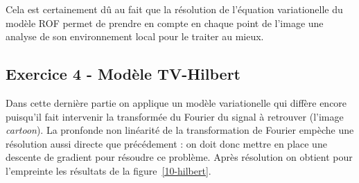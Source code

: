 \begin{figure}
\end{figure}

Cela est certainement dû au fait que la résolution de l'équation variationelle du modèle ROF permet de prendre en compte en chaque point de l'image une analyse de son environnement local pour le traiter au mieux.

\subsection{Exercice 4 - Modèle TV-Hilbert}
Dans cette dernière partie on applique un modèle variationelle qui diffère encore puisqu'il fait intervenir la transformée du Fourier du signal à retrouver (l'image \emph{cartoon}). La pronfonde non linéarité de la transformation de Fourier empèche une résolution aussi directe que précédement : on doit donc mettre en place une descente de gradient pour résoudre ce problème. Après résolution on obtient pour l'empreinte les résultats de la figure~\ref{10-hilbert}.

\begin{figure}
\end{figure}
